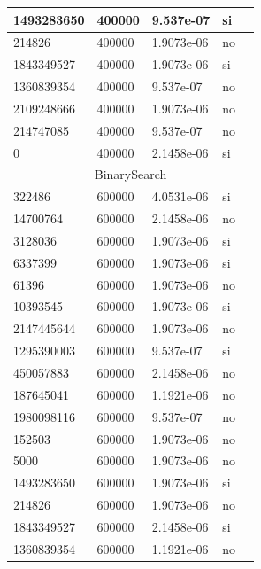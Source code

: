 \documentclass[12pt, fleqn]{article}                             %
\theoremstyle{break}                                            %
\begin{document}
\begin{longtable}{|m{5em}|m{5em}|m{10em}|m{5em}|@{}m{0pt}@{}}
            1493283650& 400000  & 9.537e-07 & si &\\[1em]    \hline
            214826& 400000  & 1.9073e-06 & no &\\[1em]    \hline
            1843349527& 400000  & 1.9073e-06 & si &\\[1em]    \hline
            1360839354& 400000  & 9.537e-07 & no &\\[1em]    \hline
            2109248666& 400000  & 1.9073e-06 & no &\\[1em]    \hline
            214747085& 400000  & 9.537e-07 & no &\\[1em]    \hline
            0& 400000  & 2.1458e-06 & si &\\[1em]    \hline
            \multicolumn{5}{|c|}{BinarySearch}   \\          \hline
            322486& 600000  & 4.0531e-06 & si &\\[1em]    \hline
            14700764& 600000  & 2.1458e-06 & no &\\[1em]    \hline
            3128036& 600000  & 1.9073e-06 & si &\\[1em]    \hline
            6337399& 600000  & 1.9073e-06 & si &\\[1em]    \hline
            61396& 600000  & 1.9073e-06 & no &\\[1em]    \hline
            10393545& 600000  & 1.9073e-06 & si &\\[1em]    \hline
            2147445644& 600000  & 1.9073e-06 & no &\\[1em]    \hline
            1295390003& 600000  & 9.537e-07 & si &\\[1em]    \hline
            450057883& 600000  & 2.1458e-06 & no &\\[1em]    \hline
            187645041& 600000  & 1.1921e-06 & no &\\[1em]    \hline
            1980098116& 600000  & 9.537e-07 & no &\\[1em]    \hline
            152503& 600000  & 1.9073e-06 & no &\\[1em]    \hline
            5000& 600000  & 1.9073e-06 & no &\\[1em]    \hline
            1493283650& 600000  & 1.9073e-06 & si &\\[1em]    \hline
            214826& 600000  & 1.9073e-06 & no &\\[1em]    \hline
            1843349527& 600000  & 2.1458e-06 & si &\\[1em]    \hline
            1360839354& 600000  & 1.1921e-06 & no &\\[1em]    \hline

\end{longtable}
\end{document}
